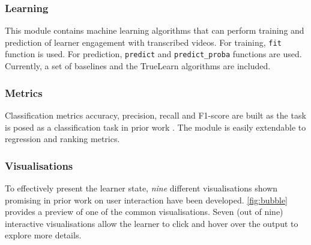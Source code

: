 \documentclass[letterpaper]{article} %
\begin{document}
\subsubsection{Learning}
This module contains machine learning algorithms that can perform training and prediction of learner engagement with transcribed videos.
For training,  \texttt{fit} function is used. For prediction, \texttt{predict} and \texttt{predict\_proba} functions are used.
Currently, a set of baselines and the TrueLearn algorithms \cite{bulathwela2022sus} are included.

\subsubsection{Metrics}
Classification metrics accuracy, precision, recall and F1-score are built as the task is posed as a classification task in prior work \cite{truelearn}. The module is easily extendable to regression and ranking metrics.

\subsubsection{Visualisations}
To effectively present the learner state, \emph{nine} different visualisations shown promising in prior work on user interaction \cite{mti6060042} have been developed.
\figurename{ \ref{fig:bubble}} provides a preview of one of the common visualisations. Seven (out of nine) interactive visualisations allow the learner to click and hover over the output to explore more details.
\end{document}
